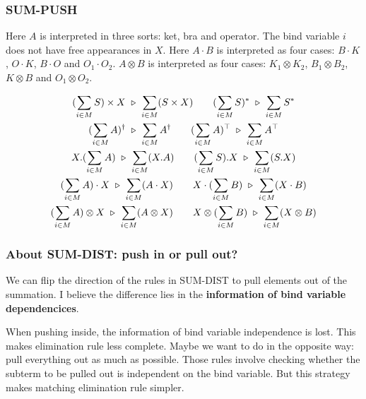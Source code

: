 \subsubsection*{\textsf{SUM-PUSH}}

Here $A$ is interpreted in three sorts: ket, bra and operator.
The bind variable $i$ does not have free appearances in $X$.
Here $A \cdot B$ is interpreted as four cases: $B \cdot K$, $O \cdot K$, $B \cdot O$ and $O_1 \cdot O_2$. $A \otimes B$ is interpreted as four cases: $K_1 \otimes K_2$, $B_1 \otimes B_2$, $K \otimes B$ and $O_1 \otimes O_2$.

\begin{gather*}
  (\sum_{i \in M} S) \times X \ \triangleright\  \sum_{i \in M} (S \times X)
  \qquad
  (\sum_{i \in M} S)^* \ \triangleright\  \sum_{i \in M} S^* \\
  (\sum_{i \in M} A)^\dagger \ \triangleright\  \sum_{i \in M} A^\dagger
  \qquad
  (\sum_{i \in M} A)^\top \ \triangleright\  \sum_{i \in M} A^\top \\
  X.(\sum_{i \in M} A) \ \triangleright\  \sum_{i \in M} (X.A)
  \qquad
  (\sum_{i \in M} S). X \ \triangleright\  \sum_{i \in M} (S.X) \\
  (\sum_{i \in M} A) \cdot X \ \triangleright\  \sum_{i \in M} (A \cdot X) 
  \qquad
  X \cdot (\sum_{i \in M} B) \ \triangleright\  \sum_{i \in M} (X \cdot B) \\
  (\sum_{i \in M} A) \otimes X \ \triangleright\  \sum_{i \in M} (A \otimes X) 
  \qquad
  X \otimes (\sum_{i \in M} B) \ \triangleright\  \sum_{i \in M} (X \otimes B)
\end{gather*}

\subsubsection*{About \textsf{SUM-DIST}: push in or pull out?}
We can flip the direction of the rules in \textsf{SUM-DIST} to pull elements out of the summation. I believe the difference lies in the \textbf{information of bind variable dependencices}.

When pushing inside, the information of bind variable independence is lost. This makes elimination rule less complete. Maybe we want to do in the opposite way: pull everything out as much as possible. Those rules involve checking whether the subterm to be pulled out is independent on the bind variable. But this strategy makes matching elimination rule simpler.


